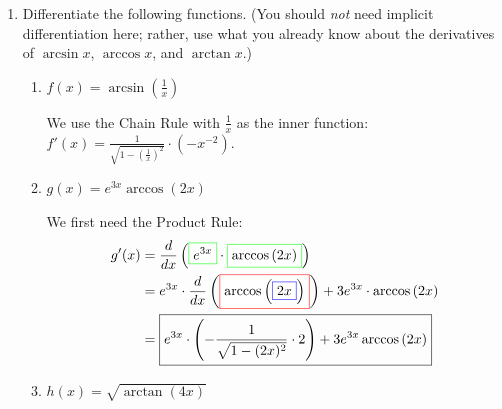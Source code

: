 \documentclass[main]{subfiles}
\begin{document}
\begin{enumerate}[resume]

\item 

  Differentiate the following functions.  (You should \emph{not} need
  implicit differentiation here; rather, use what you already know about
  the derivatives of $\arcsin x$, $\arccos x$, and $\arctan x$.)
  \begin{enumerate}
  \item
    \begin{problem}[\vfill]
      $f(x) = \displaystyle \arcsin \left( \frac{1}{x} \right)$
    \end{problem}

    \begin{solution}
      We use the Chain Rule with $\frac{1}{x}$ as the inner function:
      $\displaystyle f'(x) = \boxed{\frac{1}{\sqrt{1-\left(\frac{1}{x}
            \right)^2}}\cdot \left(- x^{-2} \right)}$.
    \end{solution}

  \item
    \begin{problem}[\vfill]
      $g(x) = \displaystyle e^{3x} \arccos(2x)$
    \end{problem}

    \begin{solution}
      We first need the Product Rule:
      \begin{align*}
        g'(x) = {} & \frac{d}{dx}
        \left(\fcolorbox{green}{white}{$\displaystyle  e^ { 3 x} $}\cdot
          \fcolorbox{green}{white}{$\displaystyle  \arccos\left(2
              x\right)$}\right) \\
        = {} & e^ { 3 x} \cdot \frac{d}{dx} \left(\fcolorbox{red}{white}{$\displaystyle \arccos\left(\fcolorbox{blue}{white}{$\displaystyle 2 x$}\right)$}\right)+ 3 e^ { 3 x} \cdot \arccos\left(2 x\right) \\
        = {} & \boxed{e^ { 3 x} \cdot \left(-\frac{1}{\sqrt{1-(2 x)^2}}\cdot
          2\right)+ 3 e^ { 3 x}  \arccos\left(2 x\right) }
      \end{align*}
    \end{solution}

  \item
    \begin{problem}[\vfill]
      $h(x) = \sqrt{\arctan (4x)}$
    \end{problem}


\end{enumerate}
\end{enumerate}
\end{document}
